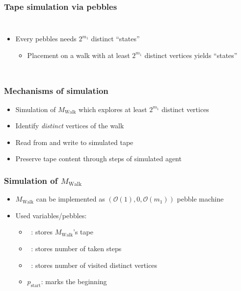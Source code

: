 \documentclass{beamer}
\DeclareMathOperator{\Tid}{T_{\text{id}}}
\DeclareMathOperator{\Tsteps}{T_{\text{steps}}}
\DeclareMathOperator{\Twalk}{T_{\text{walk}}}
\begin{document}
\begin{frame}
  \frametitle{Tape simulation via pebbles}
  
  \begin{columns}
    \begin{itemize}
      \item Every pebbles needs $2^{m_{1}}$ distinct \enquote{states}
        \begin{itemize}
          \item Placement on a walk with at least $2^{m_{1}}$ distinct vertices
            yields \enquote{states}
        \end{itemize}
    \end{itemize}
    \resizebox{\textwidth}{!}{}
  \end{columns}
\end{frame}

\begin{frame}
  \frametitle{Mechanisms of simulation}
  \begin{itemize}
    \item Simulation of $M_{\text{Walk}}$ which explores at least $2^{m_{1}}$
      distinct vertices
    \item Identify \emph{distinct} vertices of the walk
    \item Read from and write to simulated tape
    \item Preserve tape content through steps of simulated agent
  \end{itemize}
\end{frame}

\begin{frame}
  \frametitle{Simulation of $M_{\text{Walk}}$}
  \begin{itemize}
    \item $M_{\text{Walk}}$ can be implemented as
      $(\mathcal{O}(1), 0, \mathcal{O}(m_{1}))$ pebble machine
    \item Used variables/pebbles:
      \begin{itemize}
        \item $\Twalk$: stores $M_{\text{Walk}}$'s tape
        \item $\Tsteps$: stores number of taken steps
        \item $\Tid$: stores number of visited distinct vertices
        \item $p_{\text{start}}$: marks the beginning
      \end{itemize}
  \end{itemize}
\end{frame}
\end{document}
